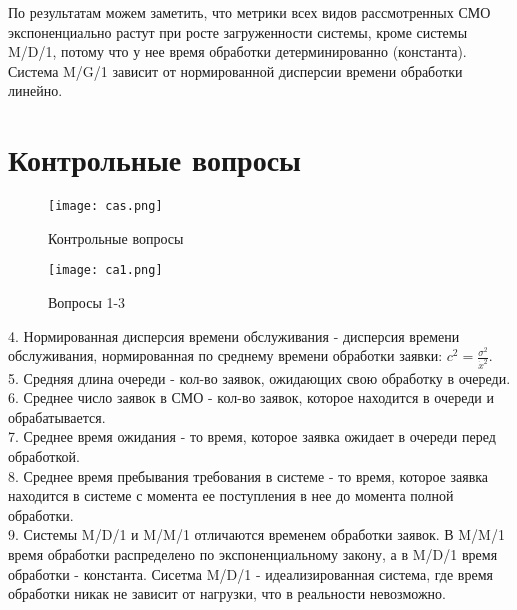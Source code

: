 По результатам можем заметить, что метрики всех видов рассмотренных СМО экспоненциально растут при росте загруженности системы, кроме системы
M/D/1, потому что у нее время обработки детерминированно (константа). Система M/G/1 зависит от нормированной дисперсии времени обработки линейно.

\section{\textbf{Контрольные вопросы}}

\begin{figure}[H]
    \centering
    \texttt{[image: cas.png]}
    \caption{Контрольные вопросы}
\end{figure}

\begin{figure}[H]
    \centering
    \texttt{[image: ca1.png]}
    \caption{Вопросы 1-3}
\end{figure}

4. Нормированная дисперсия времени обслуживания - дисперсия времени обслуживания, нормированная по среднему времени обработки заявки: 
$c^2 = \frac{\sigma^2}{\dot{x}^2}$. \\

5. Средняя длина очереди - кол-во заявок, ожидающих свою обработку в очереди. \\

6. Среднее число заявок в СМО - кол-во заявок, которое находится в очереди и обрабатывается. \\

7. Среднее время ожидания - то время, которое заявка ожидает в очереди перед обработкой. \\

8. Среднее время пребывания требования в системе - то время, которое заявка находится в системе с момента ее поступления в нее до
момента полной обработки. \\

9. Системы M/D/1 и M/M/1 отличаются временем обработки заявок. В M/M/1 время обработки распределено по экспоненциальному закону,
а в M/D/1 время обработки - константа. Сисетма M/D/1 - идеализированная система, где время обработки никак не зависит от нагрузки,
что в реальности невозможно.



\endinput

